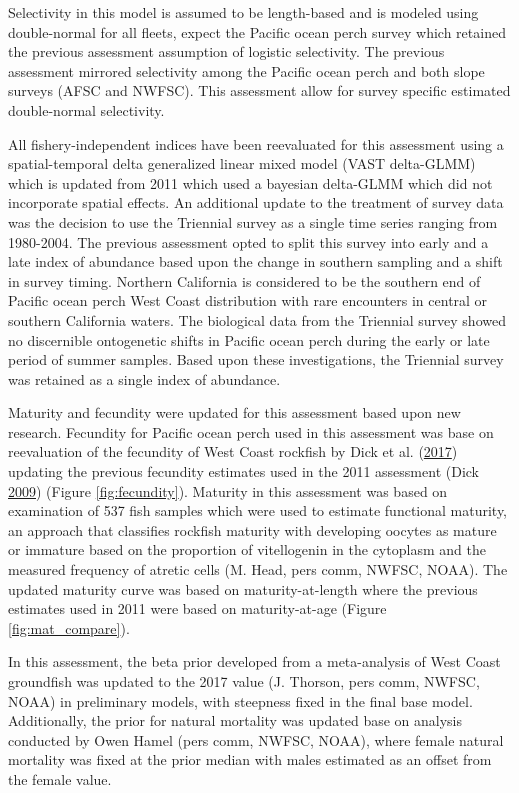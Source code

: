 \documentclass[12pt,]{article}
\begin{document}
Selectivity in this model is assumed to be length-based and is modeled
using double-normal for all fleets, expect the Pacific ocean perch
survey which retained the previous assessment assumption of logistic
selectivity. The previous assessment mirrored selectivity among the
Pacific ocean perch and both slope surveys (AFSC and NWFSC). This
assessment allow for survey specific estimated double-normal
selectivity.

All fishery-independent indices have been reevaluated for this
assessment using a spatial-temporal delta generalized linear mixed model
(VAST delta-GLMM) which is updated from 2011 which used a bayesian
delta-GLMM which did not incorporate spatial effects. An additional
update to the treatment of survey data was the decision to use the
Triennial survey as a single time series ranging from 1980-2004. The
previous assessment opted to split this survey into early and a late
index of abundance based upon the change in southern sampling and a
shift in survey timing. Northern California is considered to be the
southern end of Pacific ocean perch West Coast distribution with rare
encounters in central or southern California waters. The biological data
from the Triennial survey showed no discernible ontogenetic shifts in
Pacific ocean perch during the early or late period of summer samples.
Based upon these investigations, the Triennial survey was retained as a
single index of abundance.

Maturity and fecundity were updated for this assessment based upon new
research. Fecundity for Pacific ocean perch used in this assessment was
base on reevaluation of the fecundity of West Coast rockfish by Dick et
al. (\protect\hyperlink{ref-dick_meta-analysis_2017}{2017}) updating the
previous fecundity estimates used in the 2011 assessment (Dick
\protect\hyperlink{ref-dick_modeling_2009}{2009}) (Figure
\ref{fig:fecundity}). Maturity in this assessment was based on
examination of 537 fish samples which were used to estimate functional
maturity, an approach that classifies rockfish maturity with developing
oocytes as mature or immature based on the proportion of vitellogenin in
the cytoplasm and the measured frequency of atretic cells (M. Head, pers
comm, NWFSC, NOAA). The updated maturity curve was based on
maturity-at-length where the previous estimates used in 2011 were based
on maturity-at-age (Figure \ref{fig:mat_compare}).

In this assessment, the beta prior developed from a meta-analysis of
West Coast groundfish was updated to the 2017 value (J. Thorson, pers
comm, NWFSC, NOAA) in preliminary models, with steepness fixed in the
final base model. Additionally, the prior for natural mortality was
updated base on analysis conducted by Owen Hamel (pers comm, NWFSC,
NOAA), where female natural mortality was fixed at the prior median with
males estimated as an offset from the female value.
\end{document}
